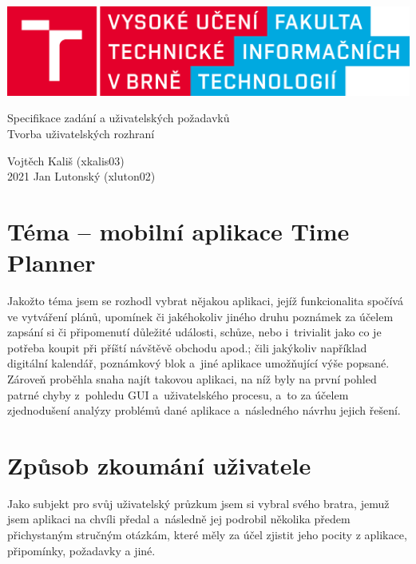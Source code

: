 \documentclass[a4paper, 11pt, twocolumn]{article}
\begin{document}
	\begin{titlepage}
		\begin{center}
			\begin{center}
			\includegraphics[scale=0.15]{logo_cz.png} \\
			\end{center}
			\huge {Specifikace zadání a uživatelských požadavků} \\
			\Large {Tvorba uživatelských rozhraní} \\
		\end{center}

		\Large{\hfill Vojtěch Kališ (xkalis03)} \\
		\Large{2021 \hfill Jan Lutonský (xluton02)}
	\end{titlepage}
	

	\section*{\large{Téma -- mobilní aplikace Time Planner}}
	\vspace*{-0.2cm}
	Jakožto téma jsem se rozhodl vybrat nějakou aplikaci, jejíž funkcionalita spočívá ve vytváření plánů, upomínek či jakéhokoliv jiného druhu poznámek za
	účelem zapsání si či připomenutí důležité události, schůze, nebo i~trivialit jako co je potřeba koupit při příští návštěvě obchodu apod.; čili jakýkoliv 
	například digitální kalendář, poznámkový blok a~jiné aplikace umožňující výše popsané. Zároveň proběhla snaha najít takovou aplikaci, na níž byly na
	první pohled patrné chyby z~pohledu GUI a~uživatelského procesu, a~to za účelem zjednodušení analýzy problémů dané aplikace a~následného návrhu
	jejich řešení.
	
	\section*{\large{Způsob zkoumání uživatele}}
	\vspace*{-0.2cm}
	Jako subjekt pro svůj uživatelský průzkum jsem si vybral svého bratra, jemuž jsem aplikaci na chvíli předal a~následně jej podrobil několika předem 
	přichystaným stručným otázkám, které měly za účel zjistit jeho pocity z aplikace, připomínky, požadavky a jiné.
\end{document}
